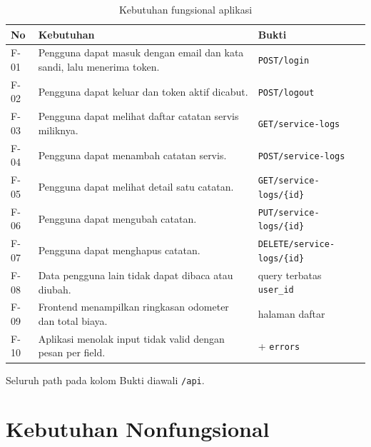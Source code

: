 \documentclass[12pt,a4paper,oneside]{book}
\begin{document}
\begin{table}[H]
\centering
\caption{Kebutuhan fungsional aplikasi}
\label{tab:fungsi}
\small
\begin{tabularx}{\textwidth}{@{}p{0.8cm} X >{\raggedright\arraybackslash}p{4.6cm}@{}}
\toprule
\textbf{No} & \textbf{Kebutuhan} & \textbf{Bukti} \\
\midrule
F-01 & Pengguna dapat masuk dengan email dan kata sandi, lalu menerima token. & \texttt{POST}\newline\texttt{/login} \\
F-02 & Pengguna dapat keluar dan token aktif dicabut. & \texttt{POST}\newline\texttt{/logout} \\
F-03 & Pengguna dapat melihat daftar catatan servis miliknya. & \texttt{GET}\newline\texttt{/service-logs} \\
F-04 & Pengguna dapat menambah catatan servis. & \texttt{POST}\newline\texttt{/service-logs} \\
F-05 & Pengguna dapat melihat detail satu catatan. & \texttt{GET}\newline\texttt{/service-logs/\{id\}} \\
F-06 & Pengguna dapat mengubah catatan. & \texttt{PUT}\newline\texttt{/service-logs/\{id\}} \\
F-07 & Pengguna dapat menghapus catatan. & \texttt{DELETE}\newline\texttt{/service-logs/\{id\}} \\
F-08 & Data pengguna lain tidak dapat dibaca atau diubah. & query terbatas \texttt{user\_id} \\
F-09 & Frontend menampilkan ringkasan odometer dan total biaya. & halaman daftar \\
F-10 & Aplikasi menolak input tidak valid dengan pesan per field. & 422 + \texttt{errors} \\
\bottomrule
\end{tabularx}
\end{table}

Seluruh path pada kolom Bukti diawali \texttt{/api}.

\section{Kebutuhan Nonfungsional}
\end{document}
